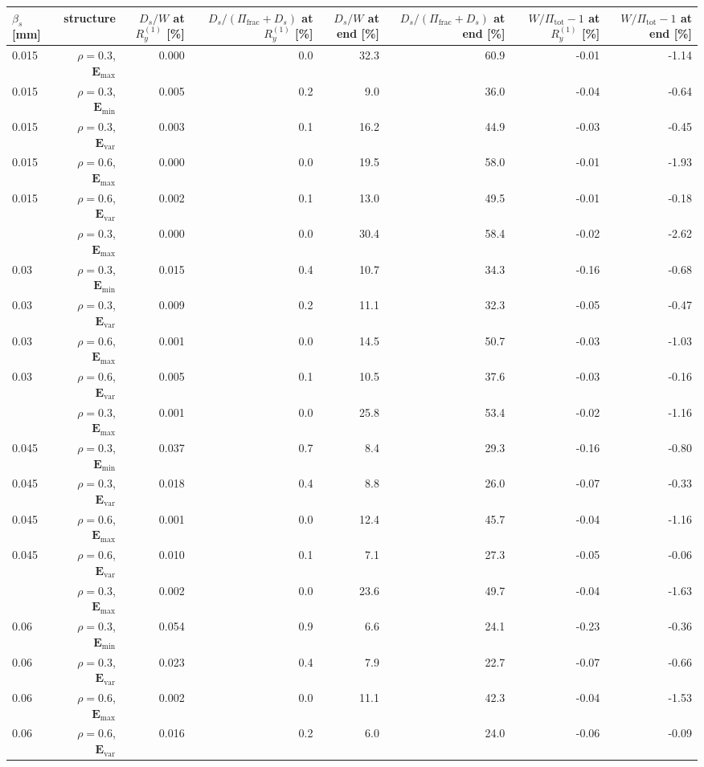\begin{tabular}{lrrrrrrr}
\toprule
$\beta_s$ [mm] & structure & $D_s/W$ at $R_y^{(1)}$ [\%] & $D_s/(\Pi_\mathrm{frac}+D_s)$ at $R_y^{(1)}$ [\%] & $D_s/W$ at end [\%] & $D_s/(\Pi_\mathrm{frac}+D_s)$ at end [\%] & $W/\Pi_\mathrm{tot}-1$ at $R_y^{(1)}$ [\%] & $W/\Pi_\mathrm{tot}-1$ at end [\%] \\
\midrule
0.015 & $\rho=0.3$, $\mathbf{E}_{\mathrm{max}}$ & 0.000 & 0.0 & 32.3 & 60.9 & -0.01 & -1.14 \\
0.015 & $\rho=0.3$, $\mathbf{E}_{\mathrm{min}}$ & 0.005 & 0.2 & 9.0 & 36.0 & -0.04 & -0.64 \\
0.015 & $\rho=0.3$, $\mathbf{E}_{\mathrm{var}}$ & 0.003 & 0.1 & 16.2 & 44.9 & -0.03 & -0.45 \\
0.015 & $\rho=0.6$, $\mathbf{E}_{\mathrm{max}}$ & 0.000 & 0.0 & 19.5 & 58.0 & -0.01 & -1.93 \\
0.015 & $\rho=0.6$, $\mathbf{E}_{\mathrm{var}}$ & 0.002 & 0.1 & 13.0 & 49.5 & -0.01 & -0.18 \\
\addlinespace
0.03 & $\rho=0.3$, $\mathbf{E}_{\mathrm{max}}$ & 0.000 & 0.0 & 30.4 & 58.4 & -0.02 & -2.62 \\
0.03 & $\rho=0.3$, $\mathbf{E}_{\mathrm{min}}$ & 0.015 & 0.4 & 10.7 & 34.3 & -0.16 & -0.68 \\
0.03 & $\rho=0.3$, $\mathbf{E}_{\mathrm{var}}$ & 0.009 & 0.2 & 11.1 & 32.3 & -0.05 & -0.47 \\
0.03 & $\rho=0.6$, $\mathbf{E}_{\mathrm{max}}$ & 0.001 & 0.0 & 14.5 & 50.7 & -0.03 & -1.03 \\
0.03 & $\rho=0.6$, $\mathbf{E}_{\mathrm{var}}$ & 0.005 & 0.1 & 10.5 & 37.6 & -0.03 & -0.16 \\
\addlinespace
0.045 & $\rho=0.3$, $\mathbf{E}_{\mathrm{max}}$ & 0.001 & 0.0 & 25.8 & 53.4 & -0.02 & -1.16 \\
0.045 & $\rho=0.3$, $\mathbf{E}_{\mathrm{min}}$ & 0.037 & 0.7 & 8.4 & 29.3 & -0.16 & -0.80 \\
0.045 & $\rho=0.3$, $\mathbf{E}_{\mathrm{var}}$ & 0.018 & 0.4 & 8.8 & 26.0 & -0.07 & -0.33 \\
0.045 & $\rho=0.6$, $\mathbf{E}_{\mathrm{max}}$ & 0.001 & 0.0 & 12.4 & 45.7 & -0.04 & -1.16 \\
0.045 & $\rho=0.6$, $\mathbf{E}_{\mathrm{var}}$ & 0.010 & 0.1 & 7.1 & 27.3 & -0.05 & -0.06 \\
\addlinespace
0.06 & $\rho=0.3$, $\mathbf{E}_{\mathrm{max}}$ & 0.002 & 0.0 & 23.6 & 49.7 & -0.04 & -1.63 \\
0.06 & $\rho=0.3$, $\mathbf{E}_{\mathrm{min}}$ & 0.054 & 0.9 & 6.6 & 24.1 & -0.23 & -0.36 \\
0.06 & $\rho=0.3$, $\mathbf{E}_{\mathrm{var}}$ & 0.023 & 0.4 & 7.9 & 22.7 & -0.07 & -0.66 \\
0.06 & $\rho=0.6$, $\mathbf{E}_{\mathrm{max}}$ & 0.002 & 0.0 & 11.1 & 42.3 & -0.04 & -1.53 \\
0.06 & $\rho=0.6$, $\mathbf{E}_{\mathrm{var}}$ & 0.016 & 0.2 & 6.0 & 24.0 & -0.06 & -0.09 \\
\bottomrule
\end{tabular}
